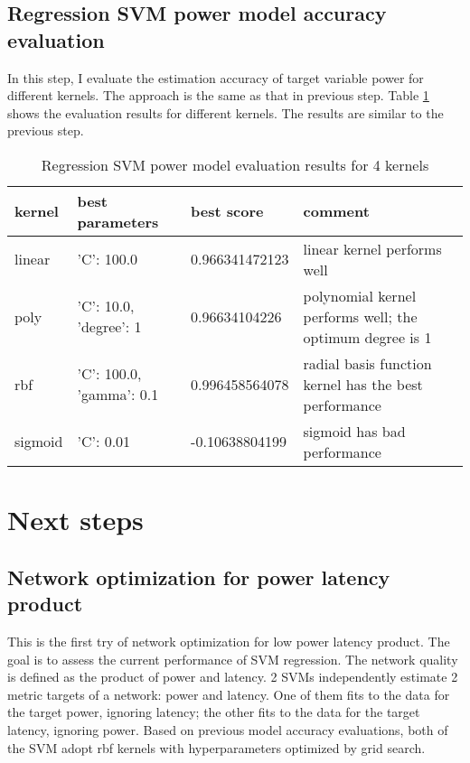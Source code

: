 \documentclass[12pt]{article}
\theoremstyle{definition}
\begin{document}
\subsection{Regression SVM power model accuracy evaluation}
In this step, I evaluate the estimation accuracy of target variable power for different kernels. The approach is the same as that in previous step. Table \ref{tab:power} shows the evaluation results for different kernels. The results are similar to the previous step.
\begin{table}[htb]
  \centering
  \begin{tabularx}{\textwidth}{|l|l|l|X|} \hline
    kernel & best parameters & best score & comment \\ \hline
    linear & {'C': 100.0} & 0.966341472123 & linear kernel performs well \\ \hline
    poly & {'C': 10.0, 'degree': 1} & 0.96634104226 & polynomial kernel performs well; the optimum degree is 1 \\ \hline
    rbf & {'C': 100.0, 'gamma': 0.1} & 0.996458564078 & radial basis function kernel has the best performance \\ \hline
    sigmoid & {'C': 0.01} & -0.10638804199 & sigmoid has bad performance \\ \hline
  \end{tabularx}
  \caption{Regression SVM power model evaluation results for 4 kernels}
  \label{tab:power}
\end{table}

\section{Next steps}
\subsection{Network optimization for power latency product}
This is the first try of network optimization for low power latency product. The goal is to assess the current performance of SVM regression. The network quality is defined as the product of power and latency. 2 SVMs independently estimate 2 metric targets of a network: power and latency. One of them fits to the data for the target power, ignoring latency; the other fits to the data for the target latency, ignoring power. Based on previous model accuracy evaluations, both of the SVM adopt rbf kernels with hyperparameters optimized by grid search.
\end{document}
